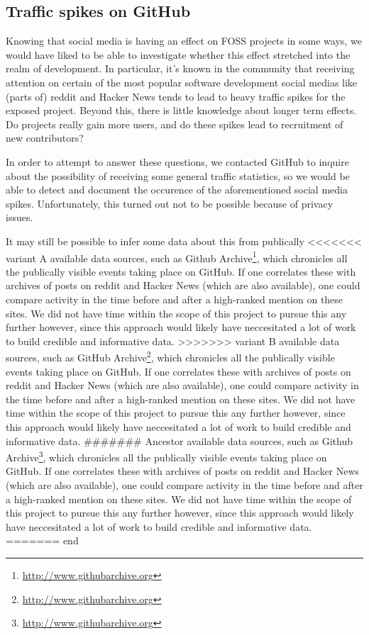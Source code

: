 \documentclass[a4paper,11pt]{article} %
\begin{document}
\subsection{Traffic spikes on GitHub}

Knowing that social media is having an effect on FOSS projects in some ways,
we would have liked to be able to investigate whether this effect stretched
into the realm of development. In particular, it's known in the community
that receiving attention on certain of the most popular software development
social medias like (parts of) reddit and Hacker News tends to lead to heavy
traffic spikes for the exposed project. Beyond this, there is little
knowledge about longer term effects. Do projects really gain more users, and
do these spikes lead to recruitment of new contributors?

In order to attempt to answer these questions, we contacted GitHub to
inquire about the possibility of receiving some general traffic statistics,
so we would be able to detect and document the occurence of the
aforementioned social media spikes. Unfortunately, this turned out not to be
possible because of privacy issues.

It may still be possible to infer some data about this from publically
<<<<<<< variant A
available data sources, such as Github
Archive\footnote{\url{http://www.githubarchive.org}}, which chronicles all
the publically visible events taking place on GitHub. If one correlates
these with archives of posts on reddit and Hacker News (which are also
available), one could compare activity in the time before and after a
high-ranked mention on these sites. We did not have time within the scope of
this project to pursue this any further however, since this approach would
likely have neccesitated a lot of work to build credible and informative
data.
>>>>>>> variant B
available data sources, such as GitHub
Archive\footnote{\url{http://www.githubarchive.org}}, which chronicles
all the publically visible events taking place on GitHub. If one
correlates these with archives of posts on reddit and Hacker News
(which are also available), one could compare activity in the time
before and after a high-ranked mention on these sites. We did not have
time within the scope of this project to pursue this any further
however, since this approach would likely have neccesitated a lot of
work to build credible and informative data.
####### Ancestor
available data sources, such as Github
Archive\footnote{\url{http://www.githubarchive.org}}, which chronicles
all the publically visible events taking place on GitHub. If one
correlates these with archives of posts on reddit and Hacker News
(which are also available), one could compare activity in the time
before and after a high-ranked mention on these sites. We did not have
time within the scope of this project to pursue this any further
however, since this approach would likely have neccesitated a lot of
work to build credible and informative data.
======= end
\end{document}
